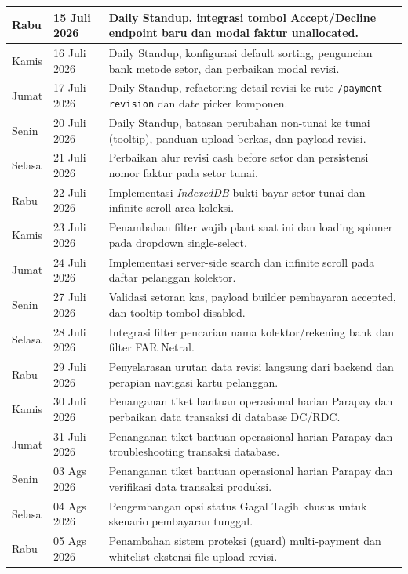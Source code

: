 \begin{center}
\begin{longtable}{|p{2.0cm}|p{2.5cm}|p{8.5cm}|}
Rabu & 15 Juli 2026 & Daily Standup, integrasi tombol Accept/Decline endpoint baru dan modal faktur unallocated. \\ \hline
Kamis & 16 Juli 2026 & Daily Standup, konfigurasi default sorting, penguncian bank metode setor, dan perbaikan modal revisi. \\ \hline
Jumat & 17 Juli 2026 & Daily Standup, refactoring detail revisi ke rute \texttt{/payment-revision} dan date picker komponen. \\ \hline
Senin & 20 Juli 2026 & Daily Standup, batasan perubahan non-tunai ke tunai (tooltip), panduan upload berkas, dan payload revisi. \\ \hline
Selasa & 21 Juli 2026 & Perbaikan alur revisi cash before setor dan persistensi nomor faktur pada setor tunai. \\ \hline
Rabu & 22 Juli 2026 & Implementasi \textit{IndexedDB} bukti bayar setor tunai dan infinite scroll area koleksi. \\ \hline
Kamis & 23 Juli 2026 & Penambahan filter wajib plant saat ini dan loading spinner pada dropdown single-select. \\ \hline
Jumat & 24 Juli 2026 & Implementasi server-side search dan infinite scroll pada daftar pelanggan kolektor. \\ \hline
Senin & 27 Juli 2026 & Validasi setoran kas, payload builder pembayaran accepted, dan tooltip tombol disabled. \\ \hline
Selasa & 28 Juli 2026 & Integrasi filter pencarian nama kolektor/rekening bank dan filter FAR Netral. \\ \hline
Rabu & 29 Juli 2026 & Penyelarasan urutan data revisi langsung dari backend dan perapian navigasi kartu pelanggan. \\ \hline
Kamis & 30 Juli 2026 & Penanganan tiket bantuan operasional harian Parapay dan perbaikan data transaksi di database DC/RDC. \\ \hline
Jumat & 31 Juli 2026 & Penanganan tiket bantuan operasional harian Parapay dan troubleshooting transaksi database. \\ \hline
Senin & 03 Ags 2026 & Penanganan tiket bantuan operasional harian Parapay dan verifikasi data transaksi produksi. \\ \hline
Selasa & 04 Ags 2026 & Pengembangan opsi status Gagal Tagih khusus untuk skenario pembayaran tunggal. \\ \hline
Rabu & 05 Ags 2026 & Penambahan sistem proteksi (guard) multi-payment dan whitelist ekstensi file upload revisi. \\ \hline

\end{longtable}
\end{center}
